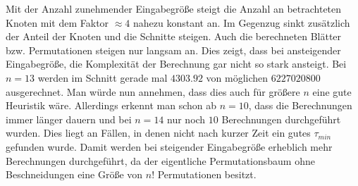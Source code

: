 \documentclass[german,version-2019-11]{uzl-thesis}
\begin{document}
\begin{table}[htpb]
\centering
{}
\caption{Brute-Force-Algorithmus mit bis zu $14$ Knoten}
\label{tab:ExpBF}
\end{table}
\noindent 
Mit der Anzahl zunehmender Eingabegröße steigt die Anzahl an betrachteten Knoten mit dem Faktor $\approx 4$ nahezu konstant an. Im Gegenzug sinkt zusätzlich der Anteil der Knoten und die Schnitte steigen. Auch die berechneten Blätter bzw. Permutationen steigen nur langsam an. Dies zeigt, dass bei ansteigender Eingabegröße, die Komplexität der Berechnung gar nicht so stark ansteigt. Bei $n=13$ werden im Schnitt gerade mal $4303.92$ von möglichen $6227020800$ ausgerechnet. Man würde nun annehmen, dass dies auch für größere $n$ eine gute Heuristik wäre. Allerdings erkennt man schon ab $n=10$, dass die Berechnungen immer länger dauern und bei $n=14$ nur noch $10$ Berechnungen durchgeführt wurden. Dies liegt an Fällen, in denen nicht nach kurzer Zeit ein gutes $\tau_{min}$ gefunden wurde. Damit werden bei steigender Eingabegröße erheblich mehr Berechnungen durchgeführt, da der eigentliche Permutationsbaum ohne Beschneidungen eine Größe von $n!$ Permutationen besitzt.  \\
\end{document}
